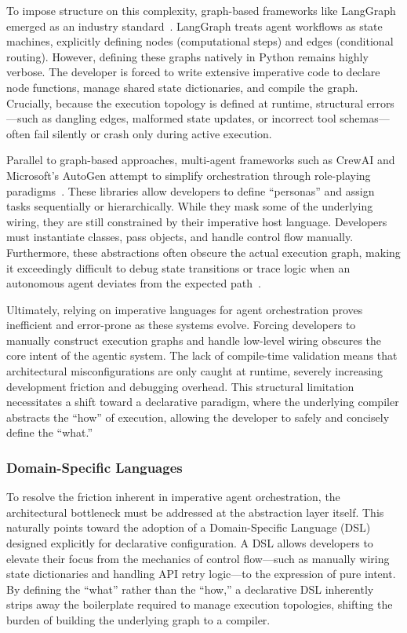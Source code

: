 \documentclass[sigconf,nonacm]{acmart}
\begin{document}
To impose structure on this complexity, graph-based frameworks like
LangGraph emerged as an industry standard~\cite{langgraph2024}. LangGraph
treats agent workflows as state machines, explicitly defining nodes
(computational steps) and edges (conditional routing). However, defining
these graphs natively in Python remains highly verbose. The developer is
forced to write extensive imperative code to declare node functions, manage
shared state dictionaries, and compile the graph. Crucially, because the
execution topology is defined at runtime, structural errors---such as
dangling edges, malformed state updates, or incorrect tool schemas---often
fail silently or crash only during active execution.

Parallel to graph-based approaches, multi-agent frameworks such as CrewAI
and Microsoft's AutoGen attempt to simplify orchestration through
role-playing paradigms~\cite{crewai2024,autogen2024}. These libraries allow
developers to define ``personas'' and assign tasks sequentially or
hierarchically. While they mask some of the underlying wiring, they are
still constrained by their imperative host language. Developers must
instantiate classes, pass objects, and handle control flow manually.
Furthermore, these abstractions often obscure the actual execution graph,
making it exceedingly difficult to debug state transitions or trace logic
when an autonomous agent deviates from the expected
path~\cite{crewai2024,autogen2024}.

Ultimately, relying on imperative languages for agent orchestration proves
inefficient and error-prone as these systems evolve. Forcing developers to
manually construct execution graphs and handle low-level wiring obscures the
core intent of the agentic system. The lack of compile-time validation
means that architectural misconfigurations are only caught at runtime,
severely increasing development friction and debugging overhead. This
structural limitation necessitates a shift toward a declarative paradigm,
where the underlying compiler abstracts the ``how'' of execution, allowing
the developer to safely and concisely define the ``what.''

\subsubsection{Domain-Specific Languages}
\label{sec:background:dsl}

To resolve the friction inherent in imperative agent orchestration, the
architectural bottleneck must be addressed at the abstraction layer itself.
This naturally points toward the adoption of a Domain-Specific Language
(DSL) designed explicitly for declarative configuration. A DSL allows
developers to elevate their focus from the mechanics of control
flow---such as manually wiring state dictionaries and handling API retry
logic---to the expression of pure intent. By defining the ``what'' rather
than the ``how,'' a declarative DSL inherently strips away the boilerplate
required to manage execution topologies, shifting the burden of building
the underlying graph to a compiler.
\end{document}
